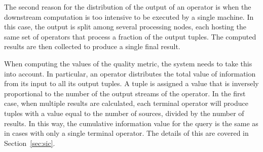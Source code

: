 	The second reason for the distribution of the output of an operator is when the downstream computation
	is too intensive to be executed by a single machine. In this case, the output is split among several
	processing nodes, each hosting the same set of operators that process a fraction of the output
	tuples.
	The computed results are then collected to produce a single final result. 
	
	When computing the values of the quality metric, the system needs to take this into account. In
	particular, an operator distributes the total value of information from its input to all its output
	tuples.
	A tuple is assigned a value that is inversely proportional to the number of the output streams of the
	operator. In the first case, when multiple results are calculated, each terminal operator will produce
	tuples with a value equal to the number of sources, divided by the number of results. In this way, the
	cumulative information value for the query is the same as in cases with only a single terminal
	operator.
	The details of this are covered in Section~\ref{sec:sic}.
